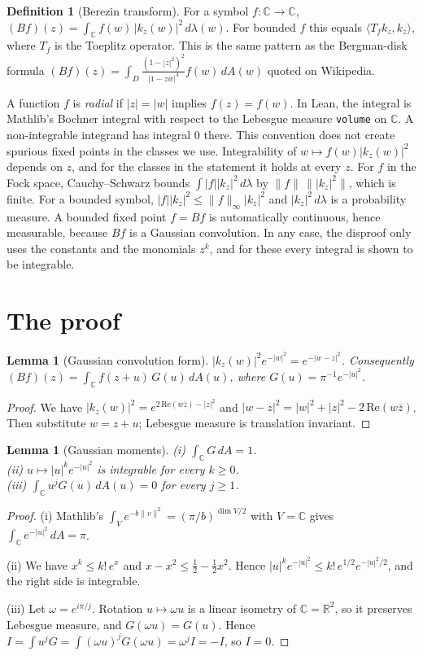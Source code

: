 \documentclass[11pt]{article}
\renewcommand{\_}{\oldus\allowbreak}
\newtheorem{lemma}[theorem]{Lemma}
\theoremstyle{definition}
\newtheorem{definition}[theorem]{Definition}
\theoremstyle{remark}
\newcommand{\C}{\mathbb{C}}
\begin{document}
\begin{definition}[Berezin transform]
For a symbol $f:\C\to\C$, $(Bf)(z)=\int_\C f(w)\,|k_z(w)|^2\,d\lambda(w)$. For bounded $f$ this equals
$\langle T_f k_z,k_z\rangle$, where $T_f$ is the Toeplitz operator. This is the same pattern as the
Bergman-disk formula $(Bf)(z)=\int_D \frac{(1-|z|^2)^2}{|1-z\bar w|^4}f(w)\,dA(w)$ quoted on Wikipedia.
\end{definition}

A function $f$ is \emph{radial} if $|z|=|w|$ implies $f(z)=f(w)$. In Lean, the integral is Mathlib's
Bochner integral with respect to the Lebesgue measure \texttt{volume} on $\C$. A non-integrable integrand
has integral $0$ there. This convention does not create spurious fixed points in the classes we use.
Integrability of $w\mapsto f(w)|k_z(w)|^2$ depends on $z$, and for the classes in the statement it
holds at every $z$. For $f$ in the Fock space, Cauchy--Schwarz bounds $\int|f||k_z|^2\,d\lambda$ by
$\|f\|\,\| |k_z|^2\|$, which is finite. For a bounded symbol, $|f||k_z|^2\le\|f\|_\infty|k_z|^2$ and
$|k_z|^2\,d\lambda$ is a probability measure. A bounded fixed point $f=Bf$ is automatically
continuous, hence measurable, because $Bf$ is a Gaussian convolution. In any case, the disproof only
uses the constants and the monomials $z^k$, and for these every integral is shown to be integrable.

\section{The proof}

\begin{lemma}[Gaussian convolution form]\label{lem:conv}
$|k_z(w)|^2e^{-|w|^2}=e^{-|w-z|^2}$. Consequently $(Bf)(z)=\int_\C f(z+u)\,G(u)\,dA(u)$, where
$G(u)=\pi^{-1}e^{-|u|^2}$.
\end{lemma}
\begin{proof}
We have $|k_z(w)|^2=e^{2\,\mathrm{Re}(w\bar z)-|z|^2}$ and $|w-z|^2=|w|^2+|z|^2-2\,\mathrm{Re}(w\bar z)$.
Then substitute $w=z+u$; Lebesgue measure is translation invariant.
\end{proof}

\begin{lemma}[Gaussian moments]\label{lem:mom}
(i) $\int_\C G\,dA=1$.\\
(ii) $u\mapsto |u|^k e^{-|u|^2}$ is integrable for every $k\ge0$.\\
(iii) $\int_\C u^jG(u)\,dA(u)=0$ for every $j\ge1$.
\end{lemma}
\begin{proof}
(i) Mathlib's $\int_V e^{-b\|v\|^2}=(\pi/b)^{\dim V/2}$ with $V=\C$ gives $\int_\C e^{-|u|^2}\,dA=\pi$.

(ii) We have $x^k\le k!\,e^{x}$ and $x-x^2\le \tfrac12-\tfrac12x^2$. Hence
$|u|^ke^{-|u|^2}\le k!\,e^{1/2}e^{-|u|^2/2}$, and the right side is integrable.

(iii) Let $\omega=e^{i\pi/j}$. Rotation $u\mapsto\omega u$ is a linear isometry of $\C=\mathbb R^2$, so it
preserves Lebesgue measure, and $G(\omega u)=G(u)$. Hence $I=\int u^jG=\int(\omega u)^jG(\omega u)=\omega^jI=-I$,
so $I=0$.
\end{proof}
\end{document}
